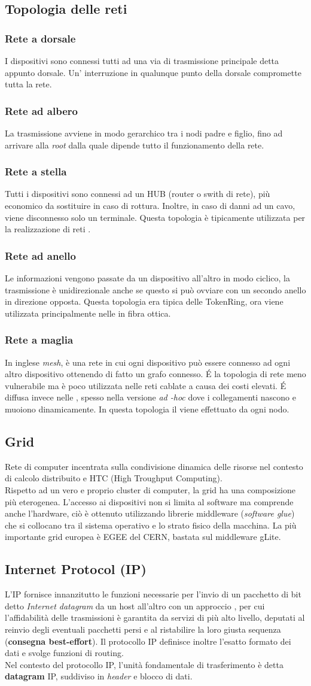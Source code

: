 \documentclass[a4paper,11pt]{article}
\def\sub#1{\subsection{#1}\label{#1}}
\def\subsub#1{\subsubsection{#1}\label{#1}}
\def\vedi#1{\nameref{#1}}
\begin{document}
\newpage
\sub{Topologia delle reti}
\subsub{Rete a dorsale}
I dispositivi sono connessi tutti ad una via di trasmissione principale detta appunto dorsale. Un' interruzione in qualunque punto della dorsale compromette tutta la rete.
\subsub{Rete ad albero} La trasmissione avviene in modo gerarchico tra i nodi padre e figlio, fino ad arrivare alla \textit{root} dalla quale dipende tutto il funzionamento della rete.
\subsub{Rete a stella} Tutti i dispositivi sono connessi ad un HUB (router o swith di rete), più economico da sostituire in caso di rottura. Inoltre, in caso di danni ad un cavo, viene disconnesso solo un terminale. Questa topologia è tipicamente utilizzata per la realizzazione di reti \vedi{LAN}. 
\subsub{Rete ad anello} Le informazioni vengono passate da un dispositivo all'altro in modo ciclico, la trasmissione è unidirezionale anche se questo si può ovviare con un secondo anello in direzione opposta. Questa topologia era tipica delle \vedi{LAN} TokenRing, ora viene utilizzata principalmente nelle \vedi{MAN} in fibra ottica.
\subsub{Rete a maglia} In inglese \textit{mesh}, è una rete in cui ogni dispositivo può essere connesso ad ogni altro dispositivo ottenendo di fatto un grafo connesso. \'E la topologia di rete meno vulnerabile ma è poco utilizzata nelle reti cablate a causa dei costi elevati. \'E diffusa invece nelle \vedi{WLAN}, spesso nella versione \textit{ad -hoc} dove i collegamenti nascono e muoiono dinamicamente. In questa topologia il \vedi{Routing} viene effettuato da ogni nodo.

\sub{Grid}
Rete di computer incentrata sulla condivisione dinamica delle risorse nel contesto di calcolo distribuito e HTC (High Troughput Computing).\\ Rispetto ad un vero e proprio cluster di computer, la grid ha una composizione più eterogenea. L'accesso ai dispositivi non si limita al software ma comprende anche l'hardware, ciò è ottenuto utilizzando librerie middleware (\textit{software glue}) che si collocano tra il sistema operativo e lo strato fisico della macchina. La più importante grid europea è EGEE del CERN, bastata sul middleware gLite.%
 
\newpage
\subsection{Internet Protocol (IP)} \label{IP}
L'IP fornisce innanzitutto le funzioni necessarie per l'invio di un pacchetto di bit detto \textit{Internet datagram} da un host all'altro con un approccio \vedi{Connectionless}, per cui l'affidabilità delle trasmissioni è garantita da servizi di più alto livello, deputati al reinvio degli eventuali pacchetti persi e al ristabilire la loro giusta sequenza (\textbf{consegna best-effort}). 
Il protocollo IP definisce inoltre l'esatto formato dei dati e svolge funzioni di routing.
\\Nel contesto del protocollo IP, l'unità fondamentale di trasferimento è detta \textbf{datagram} IP, suddiviso in \textit{header} e blocco di dati.
\end{document}
